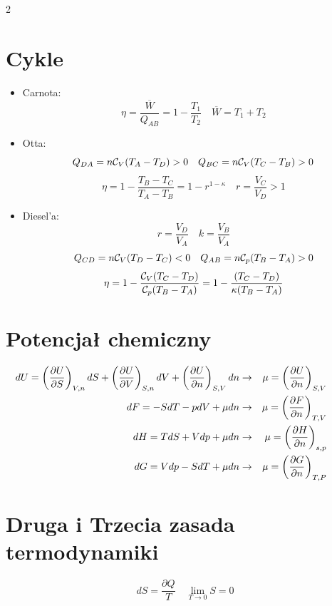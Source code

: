 \documentclass{../konspekt}
\begin{document}
\begin{multicols}{2}
  \section{Cykle}

  \begin{itemize}
    \item Carnota: $$
      \eta = \frac{\overline{W}}{Q_{AB}} = 1 - \frac{T_1}{T_2} \quad
      \overline{W} = T_1 + T_2
      $$
    \item Otta:
      $$
      Q_{DA} = n \mathcal{C}_V (T_A - T_D) > 0 \quad Q_{BC} = n \mathcal{C}_V
      (T_C - T_B) > 0
      $$
      $$
      \eta = 1 - \frac{T_B - T_C}{T_A - T_B} = 1 - r^{1 - \kappa}
      \quad r = \frac{V_C}{V_D} > 1
      $$
    \item Diesel'a:
      $$
      r = \frac{V_D}{V_A} \quad k = \frac{V_B}{V_A}
      $$
      $$
      Q_{CD} = n\mathcal{C}_V(T_D - T_C) < 0 \quad Q_{AB} = n\mathcal{C}_p (T_B - T_A) > 0
      $$
      $$
      \eta = 1 - \frac{\mathcal{C}_V(T_C - T_D)}{\mathcal{C}_p (T_B - T_A)} = 1 -
      \frac{(T_C - T_D)}{\kappa (T_B - T_A)}
      $$
  \end{itemize}
  \vspace{-2em}

  \section{Potencjał chemiczny}

  $$
  \hspace{-3em}
  \begin{aligned}
    dU = \pderiv{U}{S}_{V, n} dS + \pderiv{U}{V}_{S, n} dV +
    \pderiv{U}{n}_{S, V} dn &\rightarrow& \mu = \pderiv{U}{n}_{S, V} \\
    dF = -SdT - pdV + \mu dn &\rightarrow& \mu = \pderiv{F}{n}_{T, V} \\
    dH = TdS + Vdp + \mu dn &\rightarrow& \mu = \pderiv{H}{n}_{s, p} \\
    dG = Vdp - SdT + \mu dn & \rightarrow & \mu = \pderiv{G}{n}_{T,P}
  \end{aligned}
  $$
  \vspace{-2em}

  \section{Druga i Trzecia zasada termodynamiki}

  $$
  dS = \frac{\partial Q}{T} \quad \lim_{T \to 0} S = 0
  $$
  \vspace{-3em}


\end{multicols}
\end{document}
